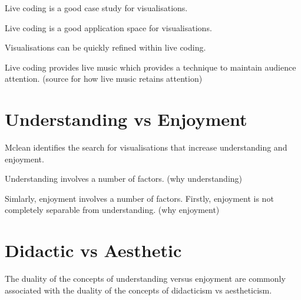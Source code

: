 Live coding is a good case study for visualisations.

Live coding is a good application space for visualisations.

Visualisations can be quickly refined within live coding.

Live coding provides live music which provides a technique to maintain audience attention. (source for how live music retains attention)


\section{Understanding vs Enjoyment}

Mclean identifies the search for visualisations that increase understanding and enjoyment.


Understanding involves a number of factors. (why understanding)

Simlarly, enjoyment involves a number of factors. Firstly, enjoyment is not completely separable from understanding. (why enjoyment)

\section{Didactic vs Aesthetic}

The duality of the concepts of understanding versus enjoyment are commonly associated with the duality of the concepts of didacticism vs aestheticism.








